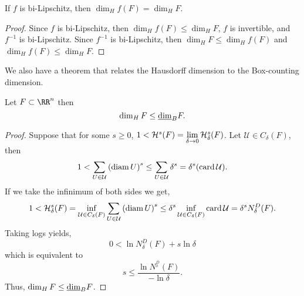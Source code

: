 \begin{corollary}
	If $f$ is bi-Lipschitz, then $\dim_H f(F)=\dim_H F$.
\end{corollary}

\begin{proof}
	Since $f$ is bi-Lipschitz, then $\dim_H f(F)\leq \dim_H F$, $f$ is invertible, and $f^{-1}$ is bi-Lipschitz.
	Since $f^{-1}$ is bi-Lipschitz, then $\dim_H F \leq \dim_H f(F)$ and $\dim_H f(F)\leq \dim_H F$.
\end{proof}

We also have a theorem that relates the Hausdorff dimension to the Box-counting dimension.

\begin{thm}
	Let $F\subset\RR^n$ then
	\[
		\operatorname{dim}_H F \leq \underline{\operatorname{dim}}_B F.
	\]
\end{thm}
\begin{proof}
	Suppose that for some $s\geq 0$, $1<\mathcal{H}^s(F)=\lim\limits_{\delta\rightarrow 0}\mathcal{H}^s_\delta(F)$.
	Let $\mathcal{U}\in C_\delta(F)$, then
	\[
		1 < \sum_{U\in\mathcal{U}}{(\operatorname{diam} U)}^s\leq\sum_{U\in\mathcal{U}}\delta^s=\delta^s (\operatorname{card} \mathcal{U}).
	\]
	If we take the infinimum of both sides we get,
	\[
		1 < \mathcal{H}^s_\delta(F)=\inf_{\mathcal{U}\in C_\delta(F)}\sum_{U\in\mathcal{U}} {(\operatorname{diam}{U})}^s
		\leq \delta^s\inf_{\mathcal{U}\in C_\delta(F)}\operatorname{card}{\mathcal{U}}=\delta^s N_\delta^D(F).
	\]
	Taking logs yields,
	\[
		0 < \ln N_\delta^D(F)+s\ln \delta
	\]
	which is equivalent to
	\[
		s\leq \frac{\ln N^_\delta^D(F)}{-\ln\delta}.
	\]
	Thus, $\operatorname{dim}_H F\leq \underline{\operatorname{dim}}_B F$.
\end{proof}
